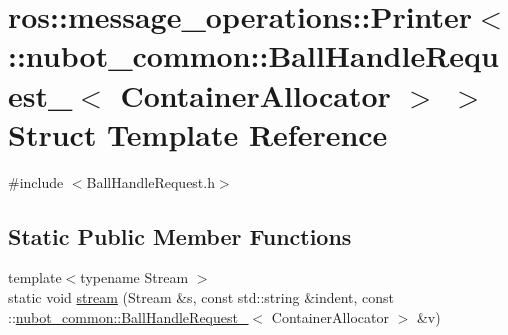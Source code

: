 \hypertarget{structros_1_1message__operations_1_1Printer_3_01_1_1nubot__common_1_1BallHandleRequest___3_01ContainerAllocator_01_4_01_4}{\section{ros\-:\-:message\-\_\-operations\-:\-:Printer$<$ \-:\-:nubot\-\_\-common\-:\-:Ball\-Handle\-Request\-\_\-$<$ Container\-Allocator $>$ $>$ Struct Template Reference}
\label{structros_1_1message__operations_1_1Printer_3_01_1_1nubot__common_1_1BallHandleRequest___3_01ContainerAllocator_01_4_01_4}
}


{\ttfamily \#include $<$Ball\-Handle\-Request.\-h$>$}

\subsection*{Static Public Member Functions}
\begin{DoxyCompactItemize}
\item 
{\footnotesize template$<$typename Stream $>$ }\\static void \hyperlink{structros_1_1message__operations_1_1Printer_3_01_1_1nubot__common_1_1BallHandleRequest___3_01ContainerAllocator_01_4_01_4_aba2d21d2619692d66f54da13321affa3}{stream} (Stream \&s, const std\-::string \&indent, const \-::\hyperlink{structnubot__common_1_1BallHandleRequest__}{nubot\-\_\-common\-::\-Ball\-Handle\-Request\-\_\-}$<$ Container\-Allocator $>$ \&v)
\end{DoxyCompactItemize}


